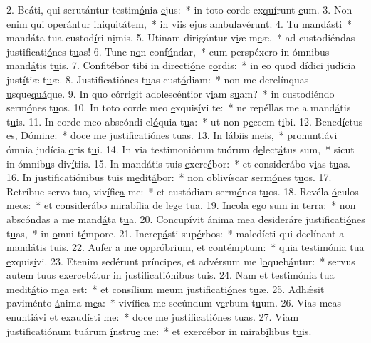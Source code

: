 2. Beáti, qui scrutántur testim\uline{ó}nia \uline{e}jus:~* in toto corde ex\uline{quí}runt \uline{e}um.
3. Non enim qui operántur in\uline{i}quit\uline{á}tem,~* in viis ejus amb\uline{u}lav\uline{é}runt.
4. T\uline{u} mand\uline{á}sti~* mandáta tua custod\uline{í}ri n\uline{i}mis.
5. Utinam dirigántur v\uline{i}æ m\uline{e}æ,~* ad custodiéndas justificati\uline{ó}nes t\uline{u}as!
6. Tunc n\uline{o}n conf\uline{ú}ndar,~* cum perspéxero in ómnibus mand\uline{á}tis t\uline{u}is.
7. Confitébor tibi in directi\uline{ó}ne c\uline{o}rdis:~* in eo quod dídici judícia just\uline{í}tiæ t\uline{u}æ.
8. Justificatiónes t\uline{u}as cust\uline{ó}diam:~* non me derelínquas \uline{u}sque\uline{quá}que.
9. In quo córrigit adolescéntior v\uline{i}am s\uline{u}am?~* in custodiéndo serm\uline{ó}nes t\uline{u}os.
10. In toto corde meo \uline{e}xquis\uline{í}vi te:~* ne repéllas me a mand\uline{á}tis t\uline{u}is.
11. In corde meo abscóndi el\uline{ó}quia t\uline{u}a:~* ut non p\uline{e}ccem t\uline{i}bi.
12. Bened\uline{í}ctus es, D\uline{ó}mine:~* doce me justificati\uline{ó}nes t\uline{u}as.
13. In l\uline{á}biis m\uline{e}is,~* pronuntiávi ómnia judícia \uline{o}ris t\uline{u}i.
14. In via testimoniórum tuórum d\uline{e}lect\uline{á}tus sum,~* sicut in ómnib\uline{u}s div\uline{í}tiis.
15. In mandátis tuis \uline{e}xerc\uline{é}bor:~* et considerábo v\uline{i}as t\uline{u}as.
16. In justificatiónibus tuis m\uline{e}dit\uline{á}bor:~* non oblivíscar serm\uline{ó}nes t\uline{u}os.
17. Retríbue servo tuo, viv\uline{í}fic\uline{a} me:~* et custódiam serm\uline{ó}nes t\uline{u}os.
18. Revéla \uline{ó}culos m\uline{e}os:~* et considerábo mirabília de l\uline{e}ge t\uline{u}a.
19. Incola ego s\uline{u}m in t\uline{e}rra:~* non abscóndas a me mand\uline{á}ta t\uline{u}a.
20. Concupívit ánima mea desideráre justificati\uline{ó}nes t\uline{u}as,~* in \uline{o}mni t\uline{é}mpore.
21. Increp\uline{á}sti sup\uline{é}rbos:~* maledícti qui declínant a mand\uline{á}tis t\uline{u}is.
22. Aufer a me oppróbrium, \uline{e}t cont\uline{é}mptum:~* quia testimónia tua \uline{e}xquis\uline{í}vi.
23. Etenim sedérunt príncipes, et advérsum me l\uline{o}queb\uline{á}ntur:~* servus autem tuus exercebátur in justificati\uline{ó}nibus t\uline{u}is.
24. Nam et testimónia tua medit\uline{á}tio m\uline{e}a est:~* et consílium meum justificati\uline{ó}nes t\uline{u}æ.
25. Adhǽsit paviménto \uline{á}nima m\uline{e}a:~* vivífica me secúndum v\uline{e}rbum t\uline{u}um.
26. Vias meas enuntiávi et \uline{e}xaud\uline{í}sti me:~* doce me justificati\uline{ó}nes t\uline{u}as.
27. Viam justificatiónum tuárum \uline{í}nstru\uline{e} me:~* et exercébor in mirab\uline{í}libus t\uline{u}is.
